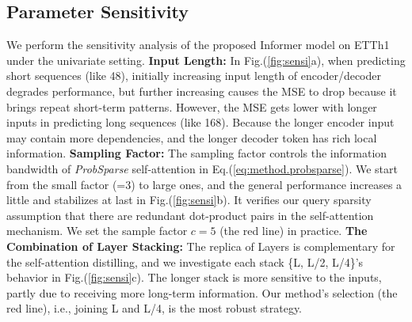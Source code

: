 \documentclass[letterpaper]{article} %
\newcommand{\mn}{Informer}
\begin{document}
\subsection{Parameter Sensitivity}
We perform the sensitivity analysis of the proposed {\mn} model on ETTh1 under the univariate setting.
\textbf{Input Length:} In Fig.(\ref{fig:sensi}a), when predicting short sequences (like 48), initially increasing input length of encoder/decoder degrades performance, but further increasing causes the MSE to drop because it brings repeat short-term patterns. However, the MSE gets lower with longer inputs in predicting long sequences (like 168). Because the longer encoder input may contain more dependencies, and the longer decoder token has rich local information.
\textbf{Sampling Factor:} The sampling factor controls the information bandwidth of \emph{ProbSparse} self-attention in Eq.(\ref{eq:method.probsparse}). We start from the small factor (=3) to large ones, and the general performance increases a little and stabilizes at last in Fig.(\ref{fig:sensi}b). It verifies our query sparsity assumption that there are redundant dot-product pairs in the self-attention mechanism. We set the sample factor $c=5$ (the red line) in practice.
\textbf{The Combination of Layer Stacking:} The replica of Layers is complementary for the self-attention distilling, and we investigate each stack \{L, L/2, L/4\}'s behavior in Fig.(\ref{fig:sensi}c). The longer stack is more sensitive to the inputs, partly due to receiving more long-term information. Our method's selection (the red line), i.e., joining L and L/4, is the most robust strategy.
\end{document}
